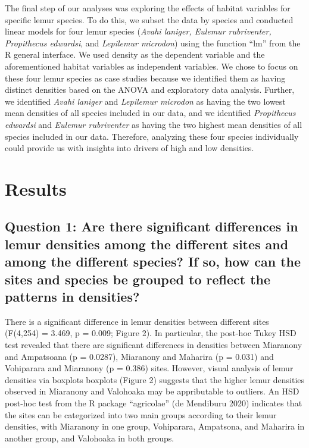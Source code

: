 \documentclass[
  12pt,
]{article}
\begin{document}
The final step of our analyses was exploring the effects of habitat
variables for specific lemur species. To do this, we subset the data by
species and conducted linear models for four lemur species (\emph{Avahi
laniger, Eulemur rubriventer, Propithecus edwardsi}, and \emph{Lepilemur
microdon}) using the function ``lm'' from the R general interface. We
used density as the dependent variable and the aforementioned habitat
variables as independent variables. We chose to focus on these four
lemur species as case studies because we identified them as having
distinct densities based on the ANOVA and exploratory data analysis.
Further, we identified \emph{Avahi laniger} and \emph{Lepilemur
microdon} as having the two lowest mean densities of all species
included in our data, and we identified \emph{Propithecus edwardsi} and
\emph{Eulemur rubriventer} as having the two highest mean densities of
all species included in our data. Therefore, analyzing these four
species individually could provide us with insights into drivers of high
and low densities.

\hypertarget{results}{%
\section{Results}\label{results}}

\hypertarget{question-1-are-there-significant-differences-in-lemur-densities-among-the-different-sites-and-among-the-different-species-if-so-how-can-the-sites-and-species-be-grouped-to-reflect-the-patterns-in-densities-1}{%
\subsection{Question 1: Are there significant differences in lemur
densities among the different sites and among the different species? If
so, how can the sites and species be grouped to reflect the patterns in
densities?}\label{question-1-are-there-significant-differences-in-lemur-densities-among-the-different-sites-and-among-the-different-species-if-so-how-can-the-sites-and-species-be-grouped-to-reflect-the-patterns-in-densities-1}}

There is a significant difference in lemur densities between different
sites (F(4,254) = 3.469, p = 0.009; Figure 2). In particular, the
post-hoc Tukey HSD test revealed that there are significant differences
in densities between Miaranony and Ampatsoana (p = 0.0287), Miaranony
and Maharira (p = 0.031) and Vohiparara and Miaranony (p = 0.386) sites.
However, visual analysis of lemur densities via boxplots boxplots
(Figure 2) suggests that the higher lemur densities observed in
Miaranony and Valohoaka may be appributable to outliers. An HSD post-hoc
test from the R package ``agricolae'' (de Mendiburu 2020) indicates that
the sites can be categorized into two main groups according to their
lemur densities, with Miaranony in one group, Vohiparara, Ampatsona, and
Maharira in another group, and Valohoaka in both groups.
\end{document}
